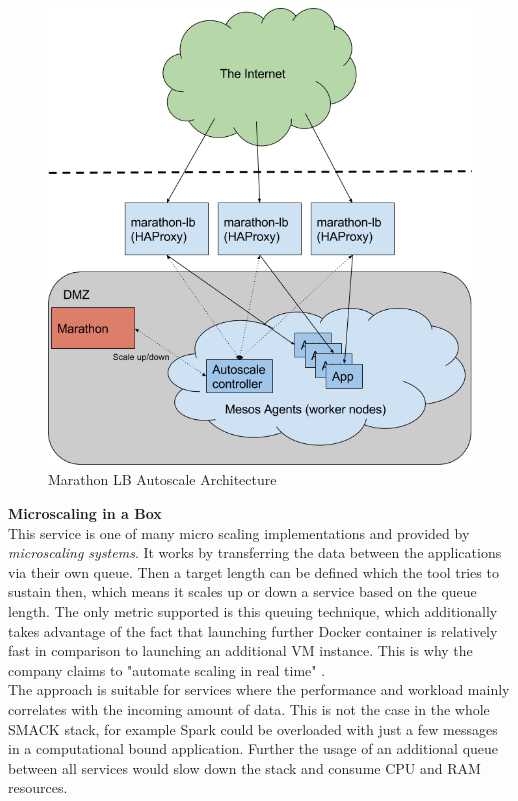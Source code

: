 \begin{figure}[!htbp]
  \centering
  \includegraphics[keepaspectratio=true,scale=0.3]{img/marathon_lb_autoscale}
    \caption{Marathon LB Autoscale Architecture \cite{marathon_lb_autoscale}}
    \label{fig:marathon_lb_autoscale}
\end{figure}

\textbf{Microscaling in a Box} \cite {microscaling}\\
This service is one of many micro scaling implementations and provided by \textit{microscaling systems}.
It works by transferring the data between the applications via their own queue.
Then a target length can be defined which the tool tries to sustain then, which means it scales up or down a service based on the queue length.
The only metric supported is this queuing technique, which additionally takes advantage of the fact that launching further Docker container is relatively fast in comparison to launching an additional VM instance.
This is why the company claims to "automate scaling in real time" \cite{microscaling}.\\
The approach is suitable for services where the performance and workload mainly correlates with the incoming amount of data.
This is not the case in the whole SMACK stack, for example Spark could be overloaded with just a few messages in a computational bound application.
Further the usage of an additional queue between all services would slow down the stack and consume CPU and RAM resources.\\


